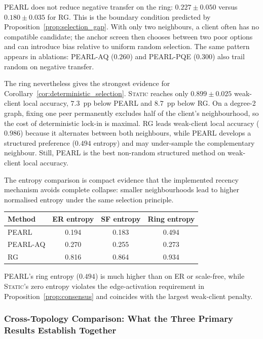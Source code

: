\documentclass[conference]{IEEEtran}
\begin{document}
\textsc{PEARL} does not reduce negative transfer on the ring: $0.227\pm0.050$ versus $0.180\pm0.035$ for \textsc{RG}. This is the boundary condition predicted by Proposition~\ref{prop:selection_gap}. With only two neighbours, a client often has no compatible candidate; the anchor screen then chooses between two poor options and can introduce bias relative to uniform random selection. The same pattern appears in ablations: \textsc{PEARL-AQ} ($0.260$) and \textsc{PEARL-PQE} ($0.300$) also trail random on negative transfer.

The ring nevertheless gives the strongest evidence for Corollary~\ref{cor:deterministic_selection}. \textsc{Static} reaches only $0.899\pm0.025$ weak-client local accuracy, $7.3$~pp below \textsc{PEARL} and $8.7$~pp below \textsc{RG}. On a degree-2 graph, fixing one peer permanently excludes half of the client's neighbourhood, so the cost of deterministic lock-in is maximal. \textsc{RG} leads weak-client local accuracy ($0.986$) because it alternates between both neighbours, while \textsc{PEARL} develops a structured preference ($0.494$ entropy) and may under-sample the complementary neighbour. Still, \textsc{PEARL} is the best non-random structured method on weak-client local accuracy.

The entropy comparison is compact evidence that the implemented recency mechanism avoids complete collapse: smaller neighbourhoods lead to higher normalised entropy under the same selection principle.

\begin{center}
\begin{tabular}{lccc}
\toprule
\textbf{Method} & \textbf{ER entropy} & \textbf{SF entropy} & \textbf{Ring entropy} \\
\midrule
\textsc{PEARL}     & 0.194 & 0.183 & 0.494 \\
\textsc{PEARL-AQ} & 0.270 & 0.255 & 0.273 \\
\textsc{RG}    & 0.816 & 0.864 & 0.934 \\
\bottomrule
\end{tabular}
\end{center}
\textsc{PEARL}'s ring entropy ($0.494$) is much higher than on ER or scale-free, while \textsc{Static}'s zero entropy violates the edge-activation requirement in Proposition~\ref{prop:consensus} and coincides with the largest weak-client penalty.

\subsubsection{Cross-Topology Comparison: What the Three Primary Results Establish Together}
\label{subsubsec:cross-topology}
\end{document}
